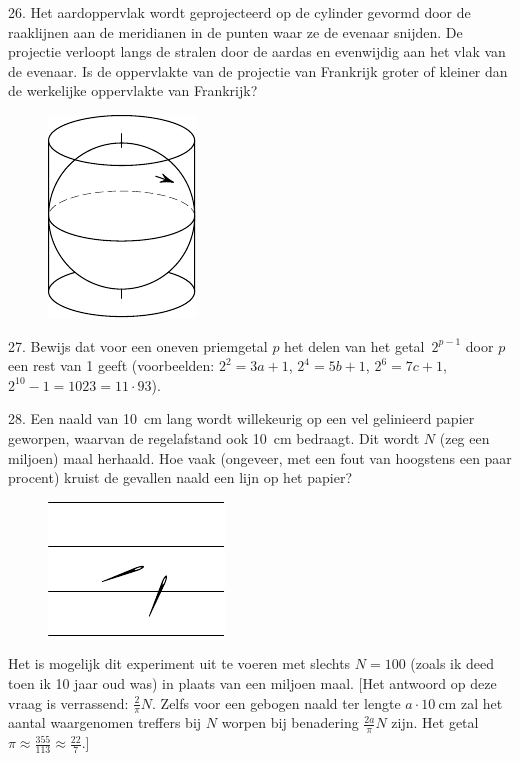 \begin{problem}{26.}
	Het aardoppervlak wordt geprojecteerd op de cylinder gevormd door de raaklijnen aan de meridianen in de punten waar ze de evenaar snijden. De projectie verloopt langs de stralen door de aardas en evenwijdig aan het vlak van de evenaar. Is de oppervlakte van de projectie van Frankrijk groter of kleiner dan de werkelijke oppervlakte van Frankrijk?
	\begin{figure}
		\includegraphics{resources/taskbook-10}
	\end{figure}
\end{problem}

\begin{problem}{27.}
	Bewijs dat voor een oneven priemgetal $p$ het delen van het getal~$2^{p-1}$ door $p$ een rest van 1 geeft (voorbeelden: $2^2 = 3 a + 1$, $2^4 = 5 b + 1$, $2^6 = 7 c + 1$, $2^{10} - 1 = 1023 = 11 \cdot 93$).
\end{problem}

\clearpage

\begin{problem}{28.}
	Een naald van \SI{10}{\cm} lang wordt willekeurig op een vel gelinieerd papier geworpen, waarvan de regelafstand ook \SI{10}{\cm} bedraagt. Dit wordt $N$ (zeg een miljoen) maal herhaald. Hoe vaak (ongeveer, met een fout van hoogstens een paar procent) kruist de gevallen naald een lijn op het papier?
	\begin{figure}
		\includegraphics{resources/taskbook-12}
	\end{figure}
	Het is mogelijk dit experiment uit te voeren met slechts $N = 100$ (zoals ik deed toen ik 10 jaar oud was) in plaats van een miljoen maal. [Het antwoord op deze vraag is verrassend: $\frac{2}{\pi} N$. Zelfs voor een gebogen naald ter lengte $a \cdot \SI{10}{\cm}$ zal het aantal waargenomen treffers bij $N$ worpen bij benadering $\frac{2 a}{\pi} N$ zijn. Het getal $\pi \approx \frac{355}{113} \approx \frac{22}{7}$.]
\end{problem}

